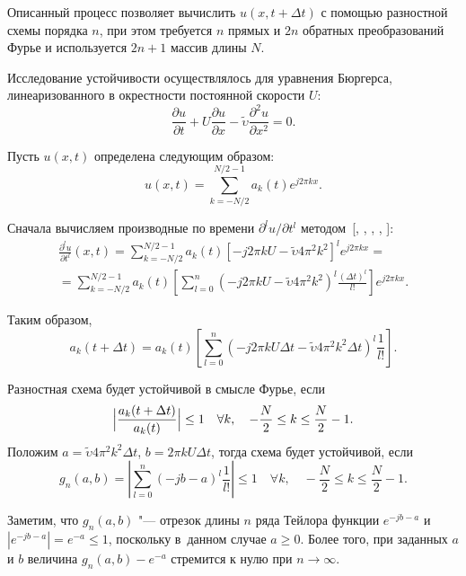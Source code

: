 Описанный процесс позволяет вычислить $u (x,t+\Delta t)$ с
помощью разностной схемы порядка $n$, при этом требуется $n$ прямых и $2n$
обратных преобразований Фурье и используется $2n+1$ массив длины $N$.

Исследование устойчивости осуществлялось для уравнения Бюргерса, линеаризованного в окрестности постоянной скорости $U$:
\begin{equation}
\label{sidnyaev:eq8}
\frac{\partial u}{\partial t}+U\frac{\partial u}{\partial x}-  \tilde{\upsilon}  \frac{\partial ^2u}{\partial x^2}=0.
\end{equation}

Пусть $u(x,t)$ определена следующим образом: 
$$
u(x,t)=\sum\limits_{k=-N/2}^{N/2-1} a_k ( t )e^{j 2 \pi k x}.
$$

Сначала вычисляем производные по времени ${\partial ^lu}/{\partial t^l}$ методом~[, ,
, , ]:
\begin{multline*}
\frac{\partial^lu}{\partial t^l} (x,t)=\sum\limits_{k=-N/2}^{N / 2-1}
a_k ( t )\left[ -j2\pi kU-  \tilde{\upsilon}  4\pi^2k^2\right]^l e^{j 2 \pi k x}=\\
=
\sum\limits_{k=-N / 2}^{N / 2-1} a_k (t)\left[ \sum\limits_{l=0}^n \left(-j2\pi kU-  \tilde{\upsilon}  4\pi ^2k^2\right)^l
\frac{(\Delta t)^l}{l!} \right]e^{j 2 \pi k x}.
\end{multline*}

Таким образом,
\[
a_k (t+\Delta t)=a_k ( t )\left[
\sum\limits_{l=0}^n \left(-j2\pi kU\Delta t-  \tilde{\upsilon}  4\pi^2k^2\Delta t \right)^l\frac{1}{l !}\right].
\]

Разностная схема будет устойчивой в смысле Фурье, если
\begin{equation}
\label{sidnyaev:eq9}
\Bigl| \frac{a_k (t+\Delta t)}{a_k ( t )} \Bigr|\le 1 \quad 
\forall k, \quad -\frac{N}{2}\le k\le \frac{N}{2}-1.
\end{equation}
Положим 
$a=  \tilde{\upsilon}  4\pi^2k^2\Delta t$, $b=2\pi kU\Delta t$, тогда схема
будет устойчивой, если
\[
g_n (a,b)=\left| \sum\limits_{l=0}^n (-jb-a)^l\frac{1}{l !} \right|\le 1 \quad \forall
k,\quad -\frac{N}{2}\le k\le \frac{N}{2}-1.
\]

Заметим, что $g_n (a,b)$ "--- отрезок длины $n$ ряда Тейлора
функции $e^{-jb-a}$ и $| e^{-jb-a} |=e^{-a}\le 1$, поскольку в~данном случае $a\ge 0$. 
Более того, при заданных $a$ и $b$ величина $g_n (a, b)-e^{-a}$ стремится к нулю при $n \to \infty$. %

